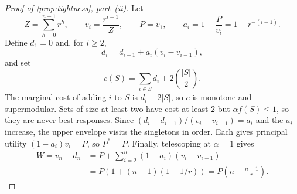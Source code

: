 \documentclass[11pt]{article}
\begin{document}
\begin{proof}[Proof of \cref{prop:tightness}, part~(ii)]
Let
\[
 Z=\sum_{h=0}^{n-1}r^h,\qquad
 v_i=\frac{r^{i-1}}{Z},\qquad
 P=v_1,\qquad
 a_i=1-\frac{P}{v_i}=1-r^{-(i-1)}.
\]
Define $d_1=0$ and, for $i\geq2$,
\[
 d_i=d_{i-1}+a_i(v_i-v_{i-1}),
\]
and set
\[
 c(S)=\sum_{i\in S}d_i+2\binom{|S|}{2}.
\]
The marginal cost of adding $i$ to $S$ is $d_i+2|S|$, so $c$ is monotone
and supermodular.  Sets of size at least two have cost at least $2$ but
$\alpha f(S)\leq1$, so they are never best responses.  Since
$(d_i-d_{i-1})/(v_i-v_{i-1})=a_i$ and the $a_i$ increase, the upper envelope
visits the singletons in order.  Each gives principal utility
$(1-a_i)v_i=P$, so $P^*=P$.  Finally, telescoping at $\alpha=1$ gives
\begin{align*}
W=v_n-d_n
 &=P+\sum_{i=2}^n(1-a_i)(v_i-v_{i-1})\\
 &=P\left(1+(n-1)(1-1/r)\right)
  =P\left(n-\frac{n-1}{r}\right).
\end{align*}
\end{proof}
\end{document}
